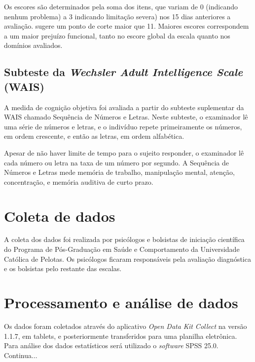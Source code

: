 \documentclass[chapter=TITLE,
               oneside,
               12pt,
               a4paper,
               english,
               brazil]{abntex2}    %
\begin{document}
            Os escores são determinados pela soma dos itens, que variam de
            0 (indicando nenhum problema) a 3 indicando limitação severa)
            nos 15 dias anteriores a avaliação.
            \textcite{rosa_validity_2007} sugere um ponto de corte maior
            que 11.
            Maiores escores correspondem a um maior prejuízo funcional,
            tanto no escore global da escala quanto nos domínios avaliados.
    
        \subsection{Subteste da \textit{Wechsler Adult Intelligence Scale} (WAIS)}
        \label{sec:wais}
    
            A medida de cognição objetiva foi avaliada a partir do subteste
            suplementar da WAIS chamado Sequência de Números e Letras.
            Neste subteste, o examinador lê uma série de números e
            letras, e o indivíduo repete primeiramente os números, em ordem
            crescente, e então as letras, em ordem alfabética.
    
            Apesar de não haver limite de tempo para o sujeito responder,
            o examinador lê cada número ou letra na taxa de um número por segundo.
            A Sequência de Números e Letras mede memória de trabalho,
            manipulação mental, atenção, concentração,
            e memória auditiva de curto prazo. \parencite{wechsler_wais_2004}

\section{Coleta de dados}\label{sec:coleta}

    A coleta dos dados foi realizada por psicólogos e bolsistas de iniciação
    científica do Programa de Pós-Graduação em Saúde e Comportamento da
    Universidade Católica de Pelotas.
    Os psicólogos ficaram responsáveis pela avaliação
    diagnóstica e os bolsistas pelo restante das escalas.

\section{Processamento e análise de dados}\label{sec:analise}

    Os dados foram coletados através do aplicativo \textit{Open Data Kit Collect}
    na versão 1.1.7, em tablets, e posteriormente transferidos para uma planilha
    eletrônica. Para análise dos dados estatísticos será utilizado o
    \textit{software} SPSS 25.0. Continua...
\end{document}

